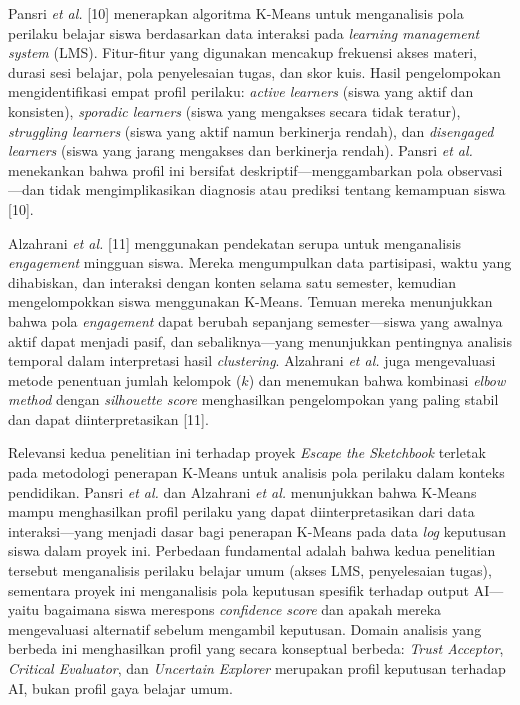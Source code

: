 \documentclass[12pt,oneside]{report}
\begin{document}
Pansri \textit{et al.} [10] menerapkan algoritma K-Means untuk menganalisis pola perilaku belajar siswa berdasarkan data interaksi pada \textit{learning management system} (LMS). Fitur-fitur yang digunakan mencakup frekuensi akses materi, durasi sesi belajar, pola penyelesaian tugas, dan skor kuis. Hasil pengelompokan mengidentifikasi empat profil perilaku: \textit{active learners} (siswa yang aktif dan konsisten), \textit{sporadic learners} (siswa yang mengakses secara tidak teratur), \textit{struggling learners} (siswa yang aktif namun berkinerja rendah), dan \textit{disengaged learners} (siswa yang jarang mengakses dan berkinerja rendah). Pansri \textit{et al.} menekankan bahwa profil ini bersifat deskriptif—menggambarkan pola observasi—dan tidak mengimplikasikan diagnosis atau prediksi tentang kemampuan siswa [10].

Alzahrani \textit{et al.} [11] menggunakan pendekatan serupa untuk menganalisis \textit{engagement} mingguan siswa. Mereka mengumpulkan data partisipasi, waktu yang dihabiskan, dan interaksi dengan konten selama satu semester, kemudian mengelompokkan siswa menggunakan K-Means. Temuan mereka menunjukkan bahwa pola \textit{engagement} dapat berubah sepanjang semester—siswa yang awalnya aktif dapat menjadi pasif, dan sebaliknya—yang menunjukkan pentingnya analisis temporal dalam interpretasi hasil \textit{clustering}. Alzahrani \textit{et al.} juga mengevaluasi metode penentuan jumlah kelompok ($k$) dan menemukan bahwa kombinasi \textit{elbow method} dengan \textit{silhouette score} menghasilkan pengelompokan yang paling stabil dan dapat diinterpretasikan [11].

Relevansi kedua penelitian ini terhadap proyek \textit{Escape the Sketchbook} terletak pada metodologi penerapan K-Means untuk analisis pola perilaku dalam konteks pendidikan. Pansri \textit{et al.} dan Alzahrani \textit{et al.} menunjukkan bahwa K-Means mampu menghasilkan profil perilaku yang dapat diinterpretasikan dari data interaksi—yang menjadi dasar bagi penerapan K-Means pada data \textit{log} keputusan siswa dalam proyek ini. Perbedaan fundamental adalah bahwa kedua penelitian tersebut menganalisis perilaku belajar umum (akses LMS, penyelesaian tugas), sementara proyek ini menganalisis pola keputusan spesifik terhadap output AI—yaitu bagaimana siswa merespons \textit{confidence score} dan apakah mereka mengevaluasi alternatif sebelum mengambil keputusan. Domain analisis yang berbeda ini menghasilkan profil yang secara konseptual berbeda: \textit{Trust Acceptor}, \textit{Critical Evaluator}, dan \textit{Uncertain Explorer} merupakan profil keputusan terhadap AI, bukan profil gaya belajar umum.
\end{document}
